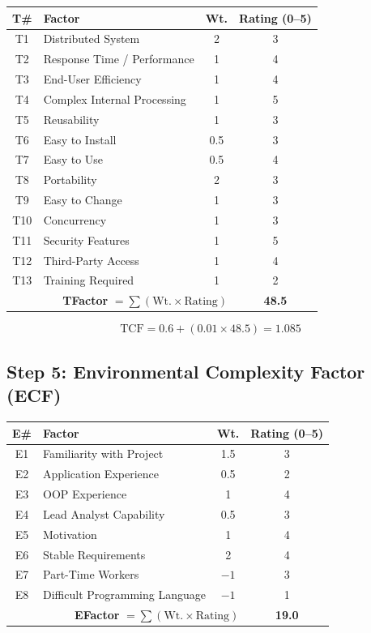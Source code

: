 \documentclass[12pt,a4paper]{article}
\begin{document}
\begin{center}
\begin{tabular}{clcc}
\toprule
\textbf{T\#} & \textbf{Factor} & \textbf{Wt.} & \textbf{Rating (0--5)} \\
\midrule
T1 & Distributed System & 2 & 3 \\
T2 & Response Time / Performance & 1 & 4 \\
T3 & End-User Efficiency & 1 & 4 \\
T4 & Complex Internal Processing & 1 & 5 \\
T5 & Reusability & 1 & 3 \\
T6 & Easy to Install & 0.5 & 3 \\
T7 & Easy to Use & 0.5 & 4 \\
T8 & Portability & 2 & 3 \\
T9 & Easy to Change & 1 & 3 \\
T10 & Concurrency & 1 & 3 \\
T11 & Security Features & 1 & 5 \\
T12 & Third-Party Access & 1 & 4 \\
T13 & Training Required & 1 & 2 \\
\midrule
\multicolumn{3}{r}{\textbf{TFactor} $= \sum(\text{Wt.} \times \text{Rating})$} & \textbf{48.5} \\
\bottomrule
\end{tabular}
\end{center}

\[
\text{TCF} = 0.6 + (0.01 \times 48.5) = \mathbf{1.085}
\]

\subsection{Step 5: Environmental Complexity Factor (ECF)}

\begin{center}
\begin{tabular}{clcc}
\toprule
\textbf{E\#} & \textbf{Factor} & \textbf{Wt.} & \textbf{Rating (0--5)} \\
\midrule
E1 & Familiarity with Project & 1.5 & 3 \\
E2 & Application Experience & 0.5 & 2 \\
E3 & OOP Experience & 1 & 4 \\
E4 & Lead Analyst Capability & 0.5 & 3 \\
E5 & Motivation & 1 & 4 \\
E6 & Stable Requirements & 2 & 4 \\
E7 & Part-Time Workers & $-1$ & 3 \\
E8 & Difficult Programming Language & $-1$ & 1 \\
\midrule
\multicolumn{3}{r}{\textbf{EFactor} $= \sum(\text{Wt.} \times \text{Rating})$} & \textbf{19.0} \\
\bottomrule
\end{tabular}
\end{center}
\end{document}
